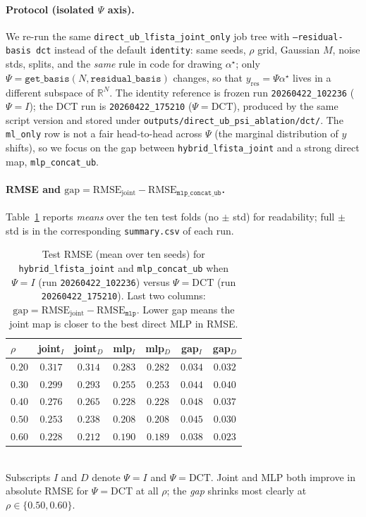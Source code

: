 \paragraph{Protocol (isolated $\Psi$ axis).}
We re-run the same \texttt{direct\_ub\_lfista\_joint\_only} job tree with \texttt{--residual-basis dct} instead of the default \texttt{identity}:
same seeds, $\rho$ grid, Gaussian $M$, noise stds, splits, and the \emph{same} rule in code for drawing $\alpha^\star$; only $\Psi=\texttt{get\_basis}(N,\texttt{residual\_basis})$ changes, so that $y_{\mathrm{res}}=\Psi\alpha^\star$ lives in a different subspace of $\mathbb{R}^N$.
The identity reference is frozen run \texttt{20260422\_102236} ($\Psi=I$); the DCT run is \texttt{20260422\_175210} ($\Psi=\mathrm{DCT}$), produced by the same script version and stored under \texttt{outputs/direct\_ub\_psi\_ablation/dct/}.
The \texttt{ml\_only} row is not a fair head-to-head across $\Psi$ (the marginal distribution of $y$ shifts), so we focus on the gap between \texttt{hybrid\_lfista\_joint} and a strong direct map, \texttt{mlp\_concat\_ub}.

\paragraph{RMSE and $\mathrm{gap}=\mathrm{RMSE}_{\mathrm{joint}}-\mathrm{RMSE}_{\texttt{mlp\_concat\_ub}}$.}
Table~\ref{tab:direct_ub_psi_rmse_gap} reports \emph{means} over the ten test folds (no $\pm$ std) for readability; full $\pm$ std is in the corresponding \texttt{summary.csv} of each run.

\begin{table}[t]
  \centering
  \caption{Test RMSE (mean over ten seeds) for \texttt{hybrid\_lfista\_joint} and \texttt{mlp\_concat\_ub} when $\Psi=I$ (run \texttt{20260422\_102236}) versus $\Psi=\mathrm{DCT}$ (run \texttt{20260422\_175210}).
  Last two columns: $\mathrm{gap}=\mathrm{RMSE}_{\mathrm{joint}}-\mathrm{RMSE}_{\texttt{mlp}}$. Lower gap means the joint map is closer to the best direct MLP in RMSE.}
  \label{tab:direct_ub_psi_rmse_gap}
  \small
  \begin{tabular}{@{}lcccccc@{}}
    \toprule
    $\rho$ & joint$_{I}$ & joint$_{D}$ & mlp$_{I}$ & mlp$_{D}$ & gap$_{I}$ & gap$_{D}$ \\
    \midrule
    $0.20$ & $0.317$ & $0.314$ & $0.283$ & $0.282$ & $0.034$ & $0.032$ \\
    $0.30$ & $0.299$ & $0.293$ & $0.255$ & $0.253$ & $0.044$ & $0.040$ \\
    $0.40$ & $0.276$ & $0.265$ & $0.228$ & $0.228$ & $0.048$ & $0.037$ \\
    $0.50$ & $0.253$ & $0.238$ & $0.208$ & $0.208$ & $0.045$ & $0.030$ \\
    $0.60$ & $0.228$ & $0.212$ & $0.190$ & $0.189$ & $0.038$ & $0.023$ \\
    \bottomrule
  \end{tabular}
  \\[0.35em]
  {\footnotesize Subscripts $I$ and $D$ denote $\Psi=I$ and $\Psi=\mathrm{DCT}$. Joint and MLP both improve in absolute RMSE for $\Psi=\mathrm{DCT}$ at all $\rho$; the \emph{gap} shrinks most clearly at $\rho\in\{0.50,0.60\}$.}
\end{table}

